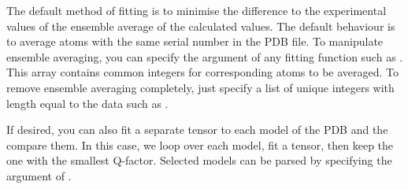 \documentclass[a4paper,10pt,english,openany,oneside]{sphinxmanual}
\begin{document}
The default method of fitting is to minimise the difference to the experimental values of the ensemble average of the calculated values. The default behaviour is to average atoms with the same serial number in the PDB file. To manipulate ensemble averaging, you can specify the  argument of any fitting function such as {\hyperref[\detokenize{reference/generated/paramagpy.fit.nlr_fit_metal_from_pcs:paramagpy.fit.nlr_fit_metal_from_pcs}]{}}. This array contains common integers for corresponding atoms to be averaged. To remove ensemble averaging completely, just specify a list of unique integers with length equal to the data such as .

%
\begin{sphinxVerbatim}[commandchars=\\\{\}]
  
    
	\PYG{p}{[}\PYG{p}{]}\PYG{p}{[}\PYG{p}{]}  
     \PYG{p}{[}\PYG{p}{]}
\PYG{p}{[}\PYG{p}{]}
\end{sphinxVerbatim}

If desired, you can also fit a separate tensor to each model of the PDB and the compare them. In this case, we loop over each model, fit a tensor, then keep the one with the smallest Q-factor. Selected models can be parsed by specifying the  argument of {\hyperref[\detokenize{reference/generated/paramagpy.protein.CustomStructure.parse:paramagpy.protein.CustomStructure.parse}]{}}.
\end{document}
